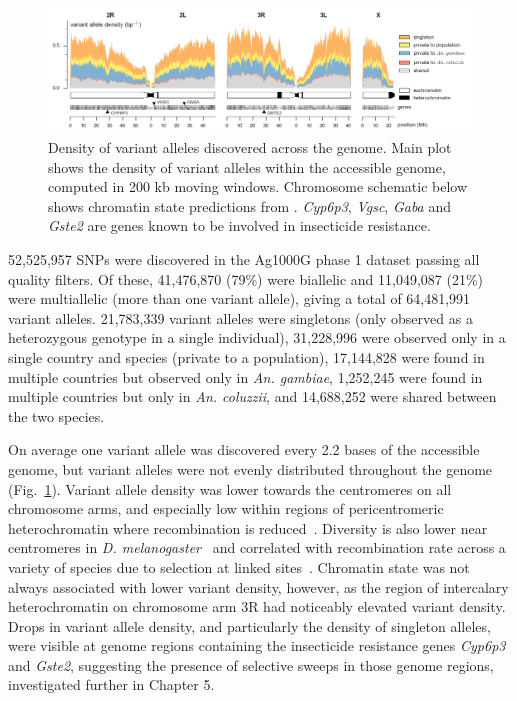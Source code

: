 \documentclass[a4paper,11pt,abstracton,hidelinks]{scrartcl}
\begin{document}
\begin{figure}[t!]
\centering
\includegraphics[width=1.1\textwidth,center]{artwork/chapter3/variant_density.png}
\caption{Density of variant alleles discovered across the genome.
%
Main plot shows the density of variant alleles within the accessible genome, computed in 200 kb moving windows.
%
Chromosome schematic below shows chromatin state predictions from \textcite{Sharakhova2010}.
%
\textit{Cyp6p3}, \textit{Vgsc}, \textit{Gaba} and \textit{Gste2} are genes known to be involved in insecticide resistance.
}
%
\label{fig:variant_density}
\end{figure}


52,525,957 SNPs were discovered in the Ag1000G phase 1 dataset passing all quality filters.
%
Of these, 41,476,870 (79\%) were biallelic and 11,049,087 (21\%) were multiallelic (more than one variant allele), giving a total of 64,481,991 variant alleles.
%
21,783,339 variant alleles were singletons (only observed as a heterozygous genotype in a single individual), 31,228,996 were observed only in a single country and species (private to a population), 17,144,828 were found in multiple countries but observed only in \textit{An. gambiae}, 1,252,245 were found in multiple countries but only in \textit{An. coluzzii}, and 14,688,252 were shared between the two species.
%


On average one variant allele was discovered every 2.2 bases of the accessible genome,
but variant alleles were not evenly distributed throughout the genome (Fig.~\ref{fig:variant_density}).
%
Variant allele density was lower towards the centromeres on all chromosome arms, and especially low within regions of pericentromeric heterochromatin where recombination is reduced~\parencite{Pombi2006,Zheng1997}.
%
Diversity is also lower near centromeres in \textit{D. melanogaster}~\parencite{Langley2012} and correlated with recombination rate across a variety of species due to selection at linked sites~\parencite{Charlesworth2012a,Elyashiv2016,
CorbettDetig2015,Burri2015,Chan2012,Spencer2006}.
%
Chromatin state was not always associated with lower variant density, however, as the region of intercalary heterochromatin on chromosome arm 3R had noticeably elevated variant density.
%
Drops in variant allele density, and particularly the density of singleton alleles, were visible at genome regions containing the insecticide resistance genes \textit{Cyp6p3} and \textit{Gste2}, suggesting the presence of selective sweeps in those genome regions, investigated further in Chapter 5.
\end{document}
